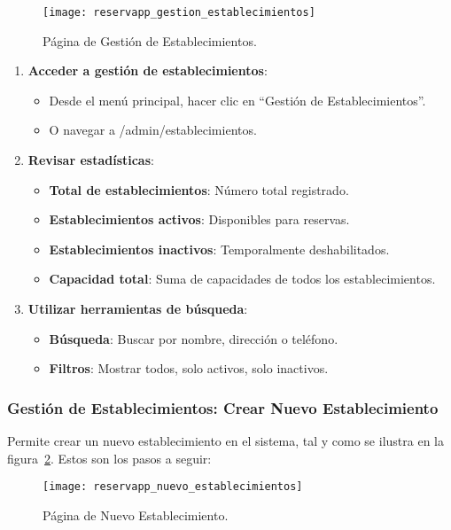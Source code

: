 \begin{figure}[H]
	\centering
		\texttt{[image: reservapp\_gestion\_establecimientos]}
	\caption{Página de Gestión de Establecimientos.}
	\label{fig:reservapp_gestion_establecimientos}
\end{figure}

\begin{enumerate}
   \item \textbf{Acceder a gestión de establecimientos}:
   \begin{itemize}
      \item Desde el menú principal, hacer clic en ``Gestión de Establecimientos''.
      \item O navegar a /admin/establecimientos.
   \end{itemize}
   \item \textbf{Revisar estadísticas}:
   \begin{itemize}
      \item \textbf{Total de establecimientos}: Número total registrado.
      \item \textbf{Establecimientos activos}: Disponibles para reservas.
	  \item \textbf{Establecimientos inactivos}: Temporalmente deshabilitados.
	  \item \textbf{Capacidad total}: Suma de capacidades de todos los establecimientos.
   \end{itemize}
   \item \textbf{Utilizar herramientas de búsqueda}:
   \begin{itemize}
      \item \textbf{Búsqueda}: Buscar por nombre, dirección o teléfono.
	  \item \textbf{Filtros}: Mostrar todos, solo activos, solo inactivos.
   \end{itemize}
\end{enumerate}

\subsubsection{Gestión de Establecimientos: Crear Nuevo Establecimiento}
Permite crear un nuevo establecimiento en el sistema, tal y como se ilustra en la figura~\ref{fig:reservapp_nuevo_establecimientos}. Estos son los pasos a seguir:

\begin{figure}[H]
	\centering
		\texttt{[image: reservapp\_nuevo\_establecimientos]}
	\caption{Página de Nuevo Establecimiento.}
	\label{fig:reservapp_nuevo_establecimientos}
\end{figure}

